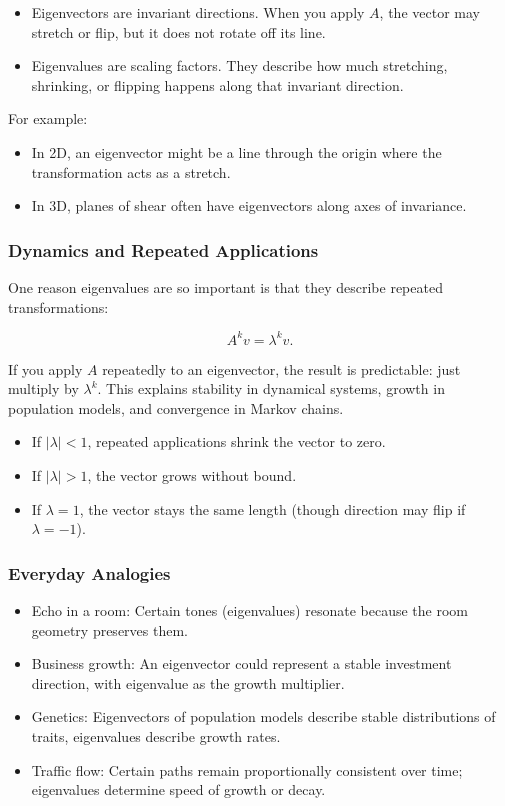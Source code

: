 \documentclass[
  letterpaper,
  DIV=11,
  numbers=noendperiod]{scrreprt}
\providecommand{\tightlist}{%
  \setlength{\itemsep}{0pt}\setlength{\parskip}{0pt}}
\begin{document}
\begin{itemize}
\tightlist
\item
  Eigenvectors are invariant directions. When you apply \(A\), the
  vector may stretch or flip, but it does not rotate off its line.
\item
  Eigenvalues are scaling factors. They describe how much stretching,
  shrinking, or flipping happens along that invariant direction.
\end{itemize}

For example:

\begin{itemize}
\tightlist
\item
  In 2D, an eigenvector might be a line through the origin where the
  transformation acts as a stretch.
\item
  In 3D, planes of shear often have eigenvectors along axes of
  invariance.
\end{itemize}

\subsubsection{Dynamics and Repeated
Applications}\label{dynamics-and-repeated-applications}

One reason eigenvalues are so important is that they describe repeated
transformations:

\[
A^k v = \lambda^k v.
\]

If you apply \(A\) repeatedly to an eigenvector, the result is
predictable: just multiply by \(\lambda^k\). This explains stability in
dynamical systems, growth in population models, and convergence in
Markov chains.

\begin{itemize}
\tightlist
\item
  If \(|\lambda| < 1\), repeated applications shrink the vector to zero.
\item
  If \(|\lambda| > 1\), the vector grows without bound.
\item
  If \(\lambda = 1\), the vector stays the same length (though direction
  may flip if \(\lambda=-1\)).
\end{itemize}

\subsubsection{Everyday Analogies}\label{everyday-analogies-57}

\begin{itemize}
\tightlist
\item
  Echo in a room: Certain tones (eigenvalues) resonate because the room
  geometry preserves them.
\item
  Business growth: An eigenvector could represent a stable investment
  direction, with eigenvalue as the growth multiplier.
\item
  Genetics: Eigenvectors of population models describe stable
  distributions of traits, eigenvalues describe growth rates.
\item
  Traffic flow: Certain paths remain proportionally consistent over
  time; eigenvalues determine speed of growth or decay.
\end{itemize}
\end{document}
